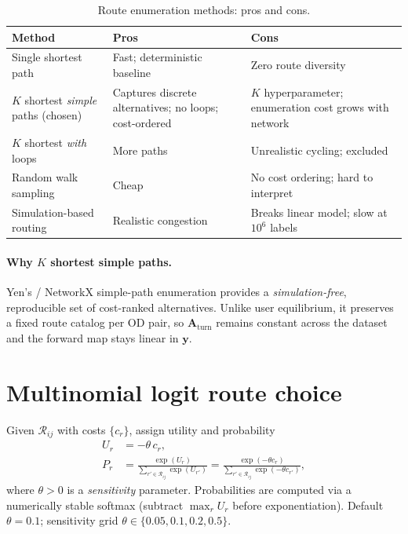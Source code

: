 \documentclass[11pt,a4paper]{report}
\newcommand{\mathbfy}{\mathbf{y}}
\newcommand{\Aturn}{\mathbf{A}_{\mathrm{turn}}}
\begin{document}
\begin{table}[ht]
\centering
\caption{Route enumeration methods: pros and cons.}
\label{tab:route_enum}
\small
\begin{tabular}{@{}p{3.5cm}p{4.5cm}p{4.5cm}@{}}
\toprule
\textbf{Method} & \textbf{Pros} & \textbf{Cons} \\
\midrule
Single shortest path &
Fast; deterministic baseline &
Zero route diversity \\
$K$ shortest \emph{simple} paths (chosen) &
Captures discrete alternatives; no loops; cost-ordered &
$K$ hyperparameter; enumeration cost grows with network \\
$K$ shortest \emph{with} loops &
More paths &
Unrealistic cycling; excluded \\
Random walk sampling &
Cheap &
No cost ordering; hard to interpret \\
Simulation-based routing &
Realistic congestion &
Breaks linear model; slow at $10^6$ labels \\
\bottomrule
\end{tabular}
\end{table}

\paragraph{Why $K$ shortest simple paths.}
Yen's / NetworkX simple-path enumeration provides a \emph{simulation-free}, reproducible set of cost-ranked alternatives. Unlike user equilibrium, it preserves a fixed route catalog per OD pair, so $\Aturn$ remains constant across the dataset and the forward map stays linear in $\mathbfy$.

\section{Multinomial logit route choice}

Given $\mathcal{R}_{ij}$ with costs $\{c_r\}$, assign utility and probability
\begin{align}
    U_r &= -\theta\, c_r, \label{eq:utility}\\
    P_r &= \frac{\exp(U_r)}{\sum_{r'\in\mathcal{R}_{ij}} \exp(U_{r'})}
    = \frac{\exp(-\theta c_r)}{\sum_{r'\in\mathcal{R}_{ij}} \exp(-\theta c_{r'})},
    \label{eq:logit}
\end{align}
where $\theta>0$ is a \emph{sensitivity} parameter. Probabilities are computed via a numerically stable softmax (subtract $\max_r U_r$ before exponentiation). Default $\theta=0.1$; sensitivity grid $\theta\in\{0.05,0.1,0.2,0.5\}$.
\end{document}
